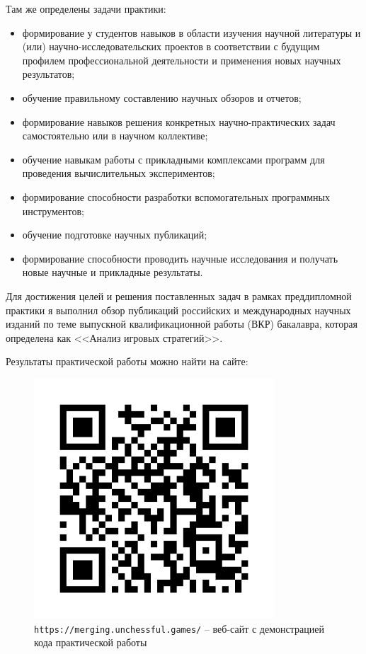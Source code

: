 \documentclass{article}
\begin{document}
    Там же определены задачи практики:
\begin{itemize}
\item формирование у студентов навыков в области изучения научной литературы и (или) научно-исследовательских проектов в соответствии с будущим профилем профессиональной деятельности и применения новых научных результатов;
\item обучение правильному составлению научных обзоров и отчетов;
\item формирование навыков решения конкретных научно-практических задач самостоятельно или в научном коллективе;
\item обучение навыкам работы с прикладными комплексами программ для проведения вычислительных экспериментов;
\item формирование способности разработки вспомогательных программных инструментов;
\item обучение подготовке научных публикаций;
\item формирование способности проводить научные исследования и получать новые научные и прикладные результаты.
\end{itemize}

    Для достижения целей и решения поставленных задач в рамках преддипломной практики я выполнил обзор публикаций российских и международных научных изданий по теме выпускной квалификационной работы (ВКР) бакалавра, которая определена как <<Анализ игровых стратегий>>.


Результаты практической работы можно найти на сайте:

\begin{figure}[h]
    \centering
    \includegraphics[width=0.8\textwidth]{img/merging-unchessful-qr.png}
    \caption{\texttt{https://merging.unchessful.games/} -- веб-сайт с демонстрацией кода практической работы}
\end{figure}
\end{document}
